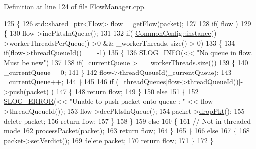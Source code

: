 Definition at line 124 of file Flow\-Manager.\-cpp.


\begin{DoxyCode}
125 \{
126     std::shared\_ptr<Flow> flow = \hyperlink{class_vsid_common_1_1_flow_manager_ad8e2576a43951a72d71b5cb9827e80e3}{getFlow}(packet);
127 
128     \textcolor{keywordflow}{if}( flow )
129     \{
130         flow->incPktsInQueue();
131         
132         \textcolor{keywordflow}{if}( \hyperlink{class_vsid_common_1_1_common_config_a69c29458a786be527fe66470ac9fbbdb}{CommonConfig::instance}()->workerThreadsPerQueue() >0 && \_workerThreads.
      size() > 0)
133         \{
134             \textcolor{keywordflow}{if}(flow->threadQueueId() == -1)
135             \{
136                 \hyperlink{_logger_8h_a119c1c29ba35a8db38e2358e41167282}{SLOG\_INFO}(<< \textcolor{stringliteral}{"No queue in flow. Must be new"})
137                 
138                 if(\_currentQueue >= \_workerThreads.size())
139                 \{
140                     \_currentQueue = 0;
141                 \}
142                 flow->threadQueueId(\_currentQueue);
143                 \_currentQueue++;
144             \}
145 
146             \textcolor{keywordflow}{if} (\_threadQueues[flow->threadQueueId()]->push(packet) )
147             \{
148                 \textcolor{keywordflow}{return} flow;
149             \}
150             \textcolor{keywordflow}{else}
151             \{
152                 \hyperlink{_logger_8h_a2a8694cd392d18f4db6b9cc9f15bafe3}{SLOG\_ERROR}(<< \textcolor{stringliteral}{"Unable to push packet onto queue : "} << flow->threadQueueId());
153                 flow->decPktsInQueue();
154                 packet->\hyperlink{class_vsid_common_1_1_i_pv4_packet_af59fa1adf18f2db27fbe9905de50d5bb}{dropPkt}();
155                 \textcolor{keyword}{delete} packet;
156                 \textcolor{keywordflow}{return} flow;
157             \}
158         \}
159         \textcolor{keywordflow}{else}
160         \{
161             \textcolor{comment}{// Not in threaded mode}
162             \hyperlink{class_vsid_common_1_1_flow_manager_a1771b987b5c030b6561713781fe90587}{processPacket}(packet);
163             \textcolor{keywordflow}{return} flow;
164         \}
165     \}
166     \textcolor{keywordflow}{else}
167     \{
168         packet->\hyperlink{class_vsid_common_1_1_i_pv4_packet_ae314f9e085588928d3c260211f80da87}{setVerdict}();
169         \textcolor{keyword}{delete} packet;
170         \textcolor{keywordflow}{return} flow;
171     \}
172 \}
\end{DoxyCode}


